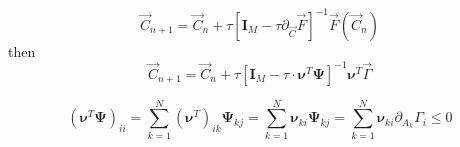 \documentclass[aps,12pt]{revtex4}
\begin{document}
\begin{equation}
	\vec{C}_{n+1} = \vec{C}_n +  \tau\left[ \bm{I}_M - \tau \partial_{\vec{C}} \vec{F} \right]^{-1} \vec{F}(\vec{C}_n)
\end{equation}
then
\begin{equation}
	\vec{C}_{n+1} = \vec{C}_n + \tau\left[ \bm{I}_M - \tau  \cdot \bm{\nu}^T  \bm{\Psi} \right]^{-1}  
	\bm{\nu}^T     \vec{\Gamma}
\end{equation}


\begin{equation}
	(\bm{\nu}^T \bm{\Psi})_{ii} = \sum_{k=1}^N (\bm{\nu}^T)_{ik} \bm{\Psi}_{kj} =  \sum_{k=1}^N \bm{\nu}_{ki} \bm{\Psi}_{kj}
= \sum_{k=1}^N \bm{\nu}_{ki} \partial_{A_k}\Gamma_i \leq 0
\end{equation}
\end{document}
